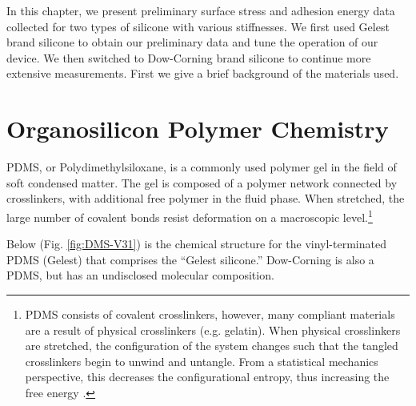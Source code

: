 In this chapter, we present preliminary surface stress and adhesion energy data collected for two types of silicone with various stiffnesses. We first used Gelest brand silicone to obtain our preliminary data and tune the operation of our device. We then switched to Dow-Corning brand silicone to continue more extensive measurements. First we give a brief background of the materials used. 


\section{Organosilicon Polymer Chemistry}
\label{section:polychem}
PDMS, or Polydimethylsiloxane, is a commonly used polymer gel in the field of soft condensed matter. The gel is composed of a polymer network connected by crosslinkers, with additional free polymer in the fluid phase. When stretched, the large number of covalent bonds resist deformation on a macroscopic level.\footnote{PDMS consists of covalent crosslinkers, however, many compliant materials are a result of physical crosslinkers (e.g. gelatin). When physical crosslinkers are stretched, the configuration of the system changes such that the tangled crosslinkers begin to unwind and untangle. From a statistical mechanics perspective, this decreases the configurational entropy, thus increasing the free energy \cite{Andreotti2020}.} 


Below (Fig. \ref{fig:DMS-V31}) is the chemical structure for the vinyl-terminated PDMS (Gelest) that comprises the ``Gelest silicone.'' Dow-Corning is also a PDMS, but has an undisclosed molecular composition.
\setatomsep{20pt}

\newcommand\setpolymerdelim[2]{\def\delimleft{#1}\def\delimright{#2}}
\def\makebraces(#1,#2)#3#4#5{%
	\edef\delimhalfdim{\the\dimexpr(#1+#2)/2}%
	\edef\delimvshift{\the\dimexpr(#1-#2)/2}%
	\chemmove{
		\node[at=(#4),yshift=(\delimvshift)]
		{$
			\left\delimleft
			\vrule height\delimhalfdim depth\delimhalfdim width0pt
			\right.
			$};
		\node[at=(#5),yshift=(\delimvshift)]
		{$
			\left.
			\vrule height\delimhalfdim depth\delimhalfdim width0pt
			\right\delimright_{\rlap{#3}}
			$};
	}%
}


